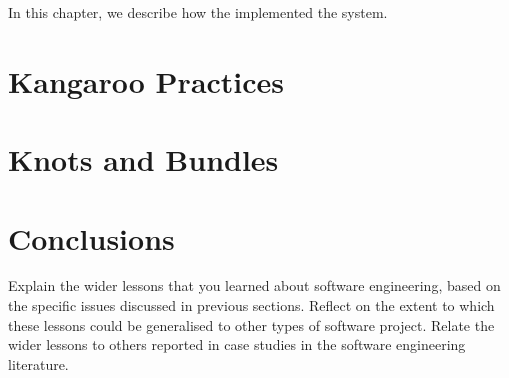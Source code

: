 \documentclass{l3proj}
\begin{document}
In this chapter, we describe how the implemented the system.

\section{Kangaroo Practices}



\section{Knots and Bundles}
\label{sec:managing}


\section{Conclusions}

Explain the wider lessons that you learned about software engineering,
based on the specific issues discussed in previous sections.  Reflect
on the extent to which these lessons could be generalised to other
types of software project.  Relate the wider lessons to others
reported in case studies in the software engineering literature.



\end{document}
